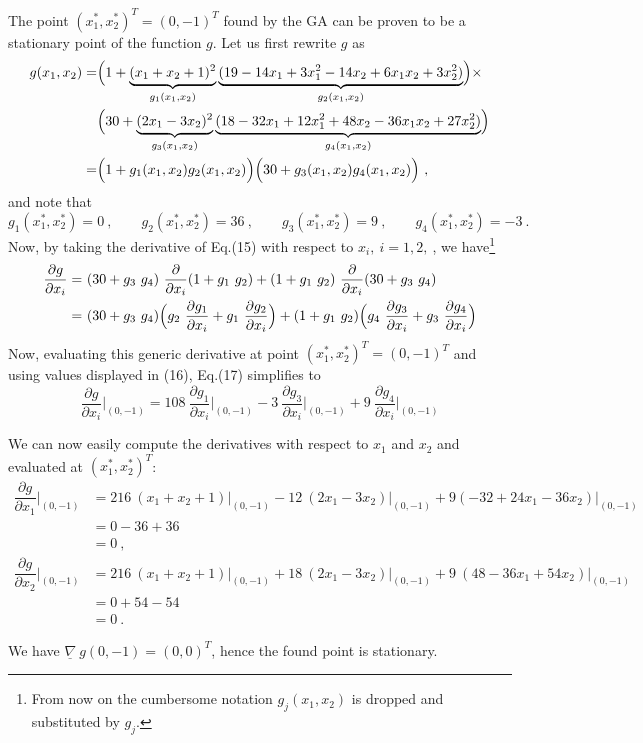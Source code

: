 \documentclass[12pt,titlepage]{article}
\begin{document}
The point $(x_1^*, x_2^*)^T = (0, -1)^T$ found by the GA can be proven to be a stationary point of the function $g$. Let us first rewrite $g$ as
\begin{align}
g(x_1,x_2) =& \Bigl(1 + \underbrace{(x_1 + x_2 + 1)^2}_{g_1(x_1,x_2)}\underbrace{(19 - 14x_1 + 3x_1^2-14x_2+6x_1x_2 +3x_2^2)}_{g_2(x_1,x_2)}\Bigr) \times \nonumber \\ 
& \Bigl( 30 + \underbrace{(2x_1-3x_2)^2}_{g_3(x_1,x_2)}\underbrace{(18 -32x_1 + 12x_1^2 + 48x_2 -36x_1x_2+27x_2^2)}_{g_4(x_1,x_2)}\Bigr)\nonumber\\
=& \Bigl(1 + g_1(x_1,x_2) g_2(x_1,x_2)\Bigr) \Bigl(30 + g_3(x_1,x_2) g_4(x_1,x_2)\Bigr) \ ,
\end{align} \label{eq::gSimplified}
and note that
\begin{equation}
g_1(x_1^*,x_2^*) = 0 \ , \qquad g_2(x_1^*,x_2^*) = 36 \ , \qquad g_3(x_1^*,x_2^*) = 9 \ , \qquad g_4(x_1^*,x_2^*) = -3 \ .
\end{equation} \label{eq::gValues}Now, by taking the derivative of Eq.(15) with respect to $x_i, \ i=1,2, \ $, we have\footnote{From now on the cumbersome notation $g_j(x_1, x_2)$ is dropped and substituted by $g_j$.}
\begin{align}
\dfrac{\partial g}{\partial x_i} = & \ (30 + g_3 \ g_4) \ \dfrac{\partial}{\partial x_i}(1 + g_1 \ g_2) + (1 + g_1 \ g_2) \ \dfrac{\partial}{\partial x_i} (30 + g_3 \ g_4) \nonumber \\
= & \ (30 + g_3 \ g_4) \Bigl( g_2 \ \dfrac{\partial g_1}{\partial x_i} + g_1 \ \dfrac{\partial g_2}{\partial x_i}\Bigr) + (1 + g_1 \ g_2) \Bigl( g_4 \ \dfrac{\partial g_3}{\partial x_i} + g_3 \ \dfrac{\partial g_4}{\partial x_i} \Bigr)
\end{align} Now, evaluating this generic derivative at point $(x_1^*, x_2^*)^T = (0, -1)^T$ and using values displayed in (16), Eq.(17) simplifies to
\begin{equation}
\dfrac{\partial g}{\partial x_i}\bigg|_{(0,-1)} = 108 \ \dfrac{\partial g_1}{\partial x_i}\bigg|_{(0,-1)} - 3 \ \dfrac{\partial g_3}{\partial x_i}\bigg|_{(0,-1)} + 9 \ \dfrac{\partial g_4}{\partial x_i}\bigg|_{(0,-1)}
\end{equation}

We can now easily compute the derivatives with respect to $x_1$ and $x_2$ and evaluated at $(x_1^*, x_2^*)^T$:
\begin{align*}
\dfrac{\partial g}{\partial x_1}\bigg|_{(0,-1)} &= 216 \ (x_1 + x_2 + 1)\bigg|_{(0,-1)} - 12 \ (2 x_1 - 3x_2)\bigg|_{(0,-1)} + 9 (-32 +24x_1-36x_2)\bigg|_{(0,-1)} \\
&= 0 -36 + 36 \\
&= 0 \ ,
\end{align*}
\begin{align*}
\dfrac{\partial g}{\partial x_2}\bigg|_{(0,-1)} &= 216 \ (x_1 + x_2 + 1)\bigg|_{(0,-1)} + 18 \ (2x_1-3x_2)\bigg|_{(0,-1)} + 9 \ (48 -36x_1 +54x_2)\bigg|_{(0,-1)} \\
&= 0 + 54 - 54 \\
&= 0 \ .
\end{align*}

We have $\underline{\nabla} \ g(0,-1) = (0, 0)^T $, hence the found point is stationary.
\end{document}
